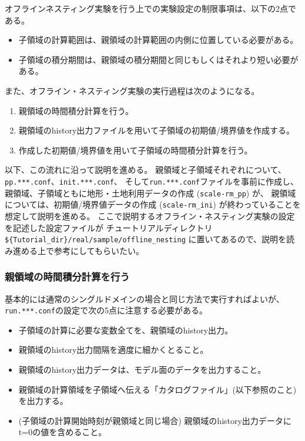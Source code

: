 オフラインネスティング実験を行う上での実験設定の制限事項は、以下の2点である。
\begin{itemize}
 \item 子領域の計算範囲は、親領域の計算範囲の内側に位置している必要がある。
 \item 子領域の積分期間は、親領域の積分期間と同じもしくはそれより短い必要がある。
\end{itemize}

また、オフライン・ネスティング実験の実行過程は次のようになる。
{\gt
\begin{enumerate}
 \item 親領域の時間積分計算を行う。
 \item 親領域のhistory出力ファイルを用いて子領域の初期値/境界値を作成する。
 \item 作成した初期値/境界値を用いて子領域の時間積分計算を行う。
\end{enumerate}
}

以下、この流れに沿って説明を進める。
親領域と子領域それぞれについて、\verb|pp.***.conf|、\verb|init.***.conf|、
そして\verb|run.***.conf|ファイルを事前に作成し、
親領域、子領域ともに地形・土地利用データの作成 (\verb|scale-rm_pp|) が、
親領域については、初期値/境界値データの作成 (\verb|scale-rm_ini|) が終わっていることを想定して説明を進める。
ここで説明するオフライン・ネスティング実験の設定を記述した設定ファイルが
チュートリアルディレクトリ\verb|${Tutorial_dir}/real/sample/offline_nesting|
に置いてあるので、説明を読み進める上で参考にしてもらいたい。

\subsubsection{親領域の時間積分計算を行う}
基本的には通常のシングルドメインの場合と同じ方法で実行すればよいが、
\verb|run.***.conf|の設定で次の5点に注意する必要がある。

\begin{itemize}
 \item 子領域の計算に必要な変数全てを、親領域のhistory出力。
 \item 親領域のhistory出力間隔を適度に細かくとること。
 \item 親領域のhistory出力データは、モデル面のデータを出力すること。
 \item 親領域の計算領域を子領域へ伝える「カタログファイル」(以下参照のこと)を出力する。
 \item (子領域の計算開始時刻が親領域と同じ場合) 親領域のhistory出力データにt=0の値を含めること。
\end{itemize}


